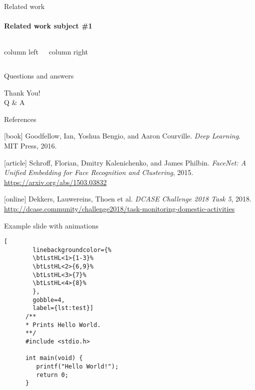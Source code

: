 
\begin{frame}{Related work}
    \framesubtitle{Related work subject \#1}
    \begin{columns}[T]

        column left

        column right
    \end{columns}


\end{frame}

\begin{frame}{Questions and answers}
    \begin{center}
    {\fontsize{40}{50}\selectfont Thank You! \\[10pt] Q \& A}
    \end{center}
\end{frame}

\begin{frame}[allowframebreaks]{References}
    \begin{thebibliography}{}
        [book]
        Goodfellow, Ian, Yoshua Bengio, and Aaron Courville.
        \newblock \emph{Deep Learning}.
        \newblock MIT Press, 2016.

        [article]
        Schroff, Florian, Dmitry Kalenichenko, and James Philbin.
        \newblock \emph{FaceNet: A Unified Embedding for Face Recognition and Clustering}, 2015.
        \newblock \url{https://arxiv.org/abs/1503.03832}

        [online]
        Dekkers, Lauwereins, Thoen et al.
        \newblock \emph{DCASE Challenge 2018 Task 5}, 2018.
        \newblock \url{http://dcase.community/challenge2018/task-monitoring-domestic-activities}
    \end{thebibliography}
\end{frame}

\begin{frame}[fragile]{Example slide with animations}
    \begin{lstlisting}[
        linebackgroundcolor={%
        \btLstHL<1>{1-3}%
        \btLstHL<2>{6,9}%
        \btLstHL<3>{7}%
        \btLstHL<4>{8}%
        },
        gobble=4,
        label={lst:test}]
      /**
      * Prints Hello World.
      **/
      #include <stdio.h>

      int main(void) {
         printf("Hello World!");
         return 0;
      }
    \end{lstlisting}

\end{frame}
